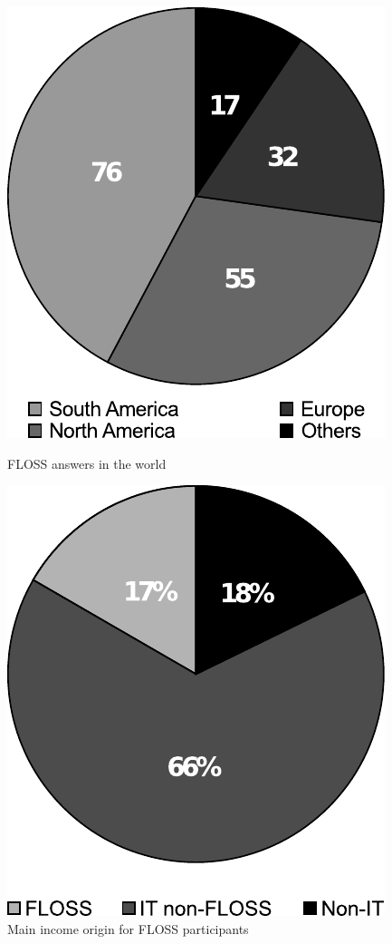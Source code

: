 \documentclass[lnbip]{svmultln}
\begin{document}
\begin{figure}[htb]
  \begin{minipage}[t]{0.5\linewidth}
    \includegraphics[scale=0.7]{floss-world.pdf}
    \caption{FLOSS answers in the world}
    \label{fig:floss-world}
  \end{minipage}
  \begin{minipage}[t]{0.5\linewidth}
    \includegraphics[scale=0.7]{floss-income.pdf}
    \caption{Main income origin for FLOSS participants}
    \label{fig:floss-income}
  \end{minipage}
\end{figure}
\end{document}
